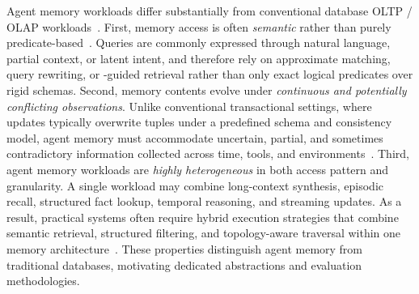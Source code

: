

 Agent memory workloads differ substantially from conventional database OLTP / OLAP workloads~\cite{packer2023memgpt, liu2026supporting}. First, memory access is often \emph{semantic} rather than purely predicate-based~\cite{kang2025bigvectorbench, caminal2025filtered}. 
Queries are commonly expressed through natural language, partial context, or latent intent, and therefore rely on approximate matching, query rewriting, or \llm-guided retrieval rather than only exact logical predicates over rigid schemas. Second, memory contents evolve under \emph{continuous and potentially conflicting observations}. 
Unlike conventional transactional settings, where updates typically overwrite tuples under a predefined schema and consistency model, agent memory must accommodate uncertain, partial, and sometimes contradictory information collected across time, tools, and environments~\cite{hu2025memory, zheng2025lifelong}. Third, agent memory workloads are \emph{highly heterogeneous} in both access pattern and granularity. 
A single workload may combine long-context synthesis, episodic recall, structured fact lookup, temporal reasoning, and streaming updates. 
As a result, practical systems often require hybrid execution strategies that combine semantic retrieval, structured filtering, and topology-aware traversal within one memory architecture~\cite{wu2026memoryeab, packer2023memgpt}. 
These properties distinguish agent memory from traditional databases, motivating dedicated abstractions and evaluation methodologies.



